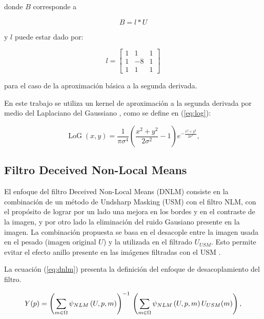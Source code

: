 donde $B$ corresponde a

\begin{equation}
\label{eq:unsharfilter}
B=l*U
\end{equation}

y $l$ puede estar dado por:

\begin{equation} l = \left[
\begin{array}{ccc}
1 & 1 & 1\\
1 & -8 & 1\\
1 & 1 & 1
\end{array}\right]
\end{equation}

para el caso de la aproximaci\'on b\'asica a la segunda derivada.

En este trabajo se utiliza un kernel de aproximaci\'on a la segunda derivada por medio del Laplaciano del Gaussiano \cite{sotak1989laplacian}, como se define en (\ref{eq:log}):

\begin{equation}
\label{eq:log}
\operatorname{LoG}(x,y) = \frac{1}{\pi\sigma^4}\left(\frac{x^2+y^2}{2\sigma^2} - 1\right)e^{-\frac{x^2+y^2}{2\sigma^2}},
\end{equation}



\subsection{Filtro Deceived Non-Local Means}
\label{ch:marco_dnlm}


El enfoque del filtro Deceived Non-Local Means (DNLM) consiste en la combinaci\'on de un m\'etodo de Undsharp Masking (USM) con el filtro NLM, con el prop\'osito de lograr por un lado una mejora en los bordes y en el contraste de la imagen, y por otro lado la eliminaci\'on del ruido Gausiano  presente en la imagen. La combinaci\'on propuesta se basa en el desacople entre la imagen usada en el pesado (imagen original $U$) y la utilizada en el filtrado $U_{USM}$. Esto permite evitar el efecto anillo presente en las im\'agenes filtradas con el USM \cite{calderon2015dewaff}.

 La ecuaci\'on (\ref{eq:dnlm}) presenta la definici\'on del enfoque de desacoplamiento del filtro.

\begin{equation}
\label{eq:dnlm}
Y(p)=\left(\sum_{m\in \Omega}\psi_{NLM}\left(U, p, m\right)\right)^{-1} \\ \left(\sum_{m\in \Omega}\psi_{NLM}\left(U, p, m\right)U_{USM}(m)\right),
\end{equation}





